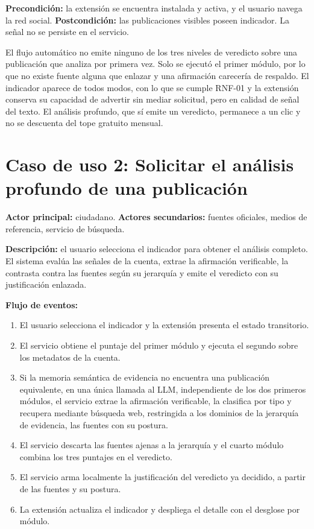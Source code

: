 \textbf{Precondición:} la extensión se encuentra instalada y activa, y el usuario navega la red social.
\textbf{Postcondición:} las publicaciones visibles poseen indicador. La señal no se persiste en el servicio.

El flujo automático no emite ninguno de los tres niveles de veredicto sobre una publicación que analiza por primera vez. Solo se ejecutó el primer módulo, por lo que no existe fuente alguna que enlazar y una afirmación carecería de respaldo. El indicador aparece de todos modos, con lo que se cumple RNF-01 y la extensión conserva su capacidad de advertir sin mediar solicitud, pero en calidad de señal del texto. El análisis profundo, que sí emite un veredicto, permanece a un clic y no se descuenta del tope gratuito mensual.

\section*{Caso de uso 2: Solicitar el análisis profundo de una publicación}

\textbf{Actor principal:} ciudadano. \textbf{Actores secundarios:} fuentes oficiales, medios de referencia, servicio de búsqueda.

\textbf{Descripción:} el usuario selecciona el indicador para obtener el análisis completo. El sistema evalúa las señales de la cuenta, extrae la afirmación verificable, la contrasta contra las fuentes según su jerarquía y emite el veredicto con su justificación enlazada.

\textbf{Flujo de eventos:}
\begin{enumerate}
  \item El usuario selecciona el indicador y la extensión presenta el estado transitorio.
  \item El servicio obtiene el puntaje del primer módulo y ejecuta el segundo sobre los metadatos de la cuenta.
  \item Si la memoria semántica de evidencia no encuentra una publicación equivalente, en una única llamada al LLM, independiente de los dos primeros módulos, el servicio extrae la afirmación verificable, la clasifica por tipo y recupera mediante búsqueda web, restringida a los dominios de la jerarquía de evidencia, las fuentes con su postura.
  \item El servicio descarta las fuentes ajenas a la jerarquía y el cuarto módulo combina los tres puntajes en el veredicto.
  \item El servicio arma localmente la justificación del veredicto ya decidido, a partir de las fuentes y su postura.
  \item La extensión actualiza el indicador y despliega el detalle con el desglose por módulo.
\end{enumerate}

